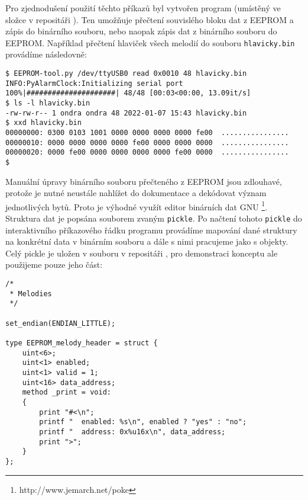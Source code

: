 Pro zjednodušení použití těchto příkazů byl vytvořen program
 (umístěný ve složce  v repositáři
). Ten umožňuje přečtení souvislého bloku dat z EEPROM a
zápis do binárního souboru, nebo naopak zápis dat z binárního souboru do
EEPROM. Například přečtení hlaviček všech melodií do souboru
\texttt{hlavicky.bin} provádíme následovně:
\begin{lstlisting}[basicstyle=\ttfamily]
$ EEPROM-tool.py /dev/ttyUSB0 read 0x0010 48 hlavicky.bin
INFO:PyAlarmClock:Initializing serial port
100%|#####################| 48/48 [00:03<00:00, 13.09it/s]
$ ls -l hlavicky.bin
-rw-rw-r-- 1 ondra ondra 48 2022-01-07 15:43 hlavicky.bin
$ xxd hlavicky.bin
00000000: 0300 0103 1001 0000 0000 0000 0000 fe00  ................
00000010: 0000 0000 0000 0000 fe00 0000 0000 0000  ................
00000020: 0000 fe00 0000 0000 0000 0000 fe00 0000  ................
$
\end{lstlisting}

Manuální úpravy binárního souboru přečteného z EEPROM jsou zdlouhavé, protože
je nutné neustále nahlížet do dokumentace a dekódovat význam jednotlivých bytů.
Proto je výhodné využít editor binárních dat GNU
\footnote{http://www.jemarch.net/poke}.
Struktura dat je popsána souborem zvaným \texttt{pickle}. Po načtení tohoto
\texttt{pickle} do interaktivního příkazového řádku programu 
provádíme mapování dané struktury na konkrétní data v binárním souboru a dále
s nimi pracujeme jako s objekty. Celý pickle je uložen v souboru
 v repositáři , pro
demonstraci konceptu ale použijeme pouze jeho část:
\begin{lstlisting}
/*
 * Melodies
 */

set_endian(ENDIAN_LITTLE);

type EEPROM_melody_header = struct {
    uint<6>;
    uint<1> enabled;
    uint<1> valid = 1;
    uint<16> data_address;
    method _print = void:
    {
        print "#<\n";
        printf "  enabled: %s\n", enabled ? "yes" : "no";
        printf "  address: 0x%u16x\n", data_address;
        print ">";
    }
};
\end{lstlisting}


